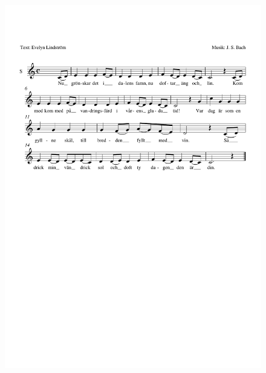 \documentclass[a6paper,11pt]{article}
\begin{document}
\setlength{\oddsidemargin}{-0.67in}
\begin{center}
\end{center}
\vspace{-40pt}
\begin{figure}[!h]
\centering
\includegraphics[width=\textwidth]{nugronskardet}
\end{figure}
\end{document}
